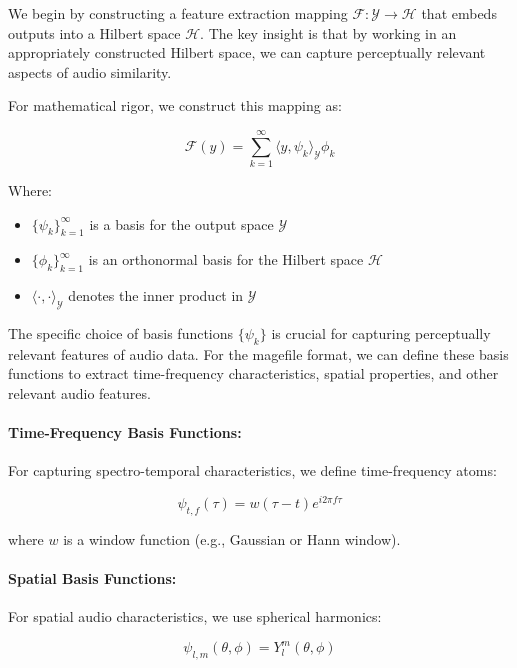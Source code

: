 We begin by constructing a feature extraction mapping $\mathcal{F}: \mathcal{Y} \rightarrow \mathcal{H}$ that embeds outputs into a Hilbert space $\mathcal{H}$. The key insight is that by working in an appropriately constructed Hilbert space, we can capture perceptually relevant aspects of audio similarity.

For mathematical rigor, we construct this mapping as:

\begin{equation}
\mathcal{F}(y) = \sum_{k=1}^{\infty} \langle y, \psi_k \rangle_{\mathcal{Y}} \phi_k
\end{equation}

Where:
\begin{itemize}
\item $\{\psi_k\}_{k=1}^{\infty}$ is a basis for the output space $\mathcal{Y}$
\item $\{\phi_k\}_{k=1}^{\infty}$ is an orthonormal basis for the Hilbert space $\mathcal{H}$
\item $\langle \cdot, \cdot \rangle_{\mathcal{Y}}$ denotes the inner product in $\mathcal{Y}$
\end{itemize}

The specific choice of basis functions $\{\psi_k\}$ is crucial for capturing perceptually relevant features of audio data. For the magefile format, we can define these basis functions to extract time-frequency characteristics, spatial properties, and other relevant audio features.

\paragraph{Time-Frequency Basis Functions:}
For capturing spectro-temporal characteristics, we define time-frequency atoms:

\begin{equation}
\psi_{t,f}(\tau) = w(\tau-t) e^{i2\pi f \tau}
\end{equation}

where $w$ is a window function (e.g., Gaussian or Hann window).

\paragraph{Spatial Basis Functions:}
For spatial audio characteristics, we use spherical harmonics:

\begin{equation}
\psi_{l,m}(\theta, \phi) = Y_l^m(\theta, \phi)
\end{equation}

